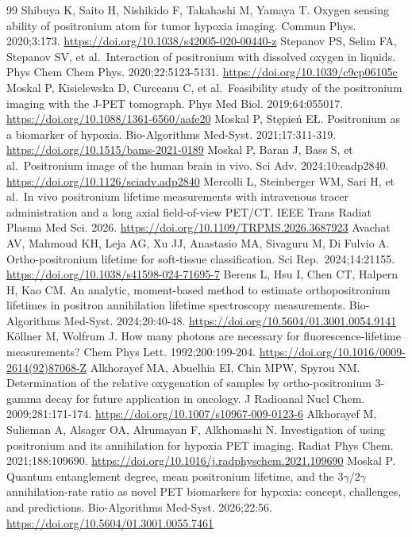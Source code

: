 \documentclass[pdflatex,sn-mathphys-num]{sn-jnl}
\begin{document}
\begin{thebibliography}{99}
 Shibuya K, Saito H, Nishikido F, Takahashi M, Yamaya T. Oxygen sensing ability of positronium atom for tumor hypoxia imaging. Commun Phys. 2020;3:173. \url{https://doi.org/10.1038/s42005-020-00440-z}
 Stepanov PS, Selim FA, Stepanov SV, et al.~Interaction of positronium with dissolved oxygen in liquids. Phys Chem Chem Phys. 2020;22:5123-5131. \url{https://doi.org/10.1039/c9cp06105c}
 Moskal P, Kisielewska D, Curceanu C, et al.~Feasibility study of the positronium imaging with the J-PET tomograph. Phys Med Biol. 2019;64:055017. \url{https://doi.org/10.1088/1361-6560/aafe20}
 Moskal P, St{\k{e}}pie{\'n} E{\L}. Positronium as a biomarker of hypoxia. Bio-Algorithms Med-Syst. 2021;17:311-319. \url{https://doi.org/10.1515/bams-2021-0189}
 Moskal P, Baran J, Bass S, et al.~Positronium image of the human brain in vivo. Sci Adv. 2024;10:eadp2840. \url{https://doi.org/10.1126/sciadv.adp2840}
 Mercolli L, Steinberger WM, Sari H, et al.~In vivo positronium lifetime measurements with intravenous tracer administration and a long axial field-of-view PET/CT. IEEE Trans Radiat Plasma Med Sci. 2026. \url{https://doi.org/10.1109/TRPMS.2026.3687923}
 Avachat AV, Mahmoud KH, Leja AG, Xu JJ, Anastasio MA, Sivaguru M, Di Fulvio A. Ortho-positronium lifetime for soft-tissue classification. Sci Rep.~2024;14:21155. \url{https://doi.org/10.1038/s41598-024-71695-7}
 Berens L, Hsu I, Chen CT, Halpern H, Kao CM. An analytic, moment-based method to estimate orthopositronium lifetimes in positron annihilation lifetime spectroscopy measurements. Bio-Algorithms Med-Syst. 2024;20:40-48. \url{https://doi.org/10.5604/01.3001.0054.9141}
 K{\"o}llner M, Wolfrum J. How many photons are necessary for fluorescence-lifetime measurements? Chem Phys Lett. 1992;200:199-204. \url{https://doi.org/10.1016/0009-2614(92)87068-Z}
 Alkhorayef MA, Abuelhia EI, Chin MPW, Spyrou NM. Determination of the relative oxygenation of samples by ortho-positronium 3-gamma decay for future application in oncology. J Radioanal Nucl Chem. 2009;281:171-174. \url{https://doi.org/10.1007/s10967-009-0123-6}
 Alkhorayef M, Sulieman A, Alsager OA, Alrumayan F, Alkhomashi N. Investigation of using positronium and its annihilation for hypoxia PET imaging. Radiat Phys Chem. 2021;188:109690. \url{https://doi.org/10.1016/j.radphyschem.2021.109690}
 Moskal P. Quantum entanglement degree, mean positronium lifetime, and the \(3\gamma\)/\(2\gamma\) annihilation-rate ratio as novel PET biomarkers for hypoxia: concept, challenges, and predictions. Bio-Algorithms Med-Syst. 2026;22:56. \url{https://doi.org/10.5604/01.3001.0055.7461}

\end{thebibliography}
\end{document}
